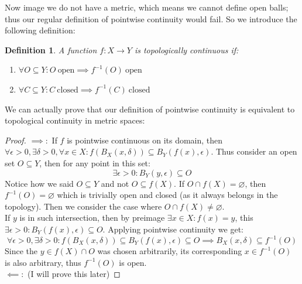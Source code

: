 \documentclass{exam}
\newtheorem{defn}{Definition}[section]
\begin{document}
Now image we do not have a metric, which means we cannot define open balls; thus our regular definition of pointwise continuity would fail. So we introduce the following definition:
\begin{defn}
A function $f: X \xrightarrow{} Y$ is topologically continuous if:
\begin{enumerate}
  \item $\forall O \subseteq Y: O \ \text{open} \implies f^{-1}(O) \ \text{open}$
  \item $\forall C \subseteq Y: C \ \text{closed} \implies f^{-1}(C) \ \text{closed}$
\end{enumerate}
\end{defn}
We can actually prove that our definition of pointwise continuity is equivalent to topological continuity in metric spaces:
\begin{proof}
$\implies:$ If $f$ is pointwise continuous on its domain, then $\forall \epsilon > 0, \exists \delta > 0, \forall x \in X: f(B_X(x, \delta)) \subseteq B_Y(f(x), \epsilon)$. Thus consider an open set $O \subseteq Y$, then for any point in this set:
\begin{equation*}
  \exists \epsilon > 0: B_Y(y, \epsilon) \subseteq O
\end{equation*}
Notice how we said $O \subseteq Y$ and not $O \subseteq f(X)$. If $O \cap f(X) = \varnothing$, then $f^{-1}(O) = \varnothing$ which is trivially open and closed (as it always belongs in the topology). Then we consider the case where $O \cap f(X) \neq \varnothing$.\\

If $y$ is in such intersection, then by preimage $\exists x \in X: f(x) = y$, this $\exists \epsilon > 0: B_Y(f(x), \epsilon) \subseteq O$. Applying pointwise continuity we get:
\begin{equation*}
  \forall \epsilon > 0, \exists \delta > 0: f(B_X(x, \delta)) \subseteq B_Y(f(x), \epsilon) \subseteq O \implies B_X(x, \delta) \subseteq f^{-1}(O)
\end{equation*}
Since the $y \in f(X) \cap O$ was chosen arbitrarily, its corresponding $x \in f^{-1}(O)$ is also arbitrary, thus $f^{-1}(O)$ is open.\\

$\impliedby:$ (I will prove this later)
\end{proof}
\end{document}

